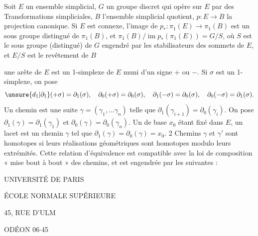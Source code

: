 Soit $E$ un ensemble simplicial,  $G$ un groupe discret qui opère sur $E$ par des Transformations simpliciales, $B$ l'ensemble simplicial quotient,  $p:E\to B$ la projection canonique. Si $E$ est connexe, l'image de $p_*:\pi_1(E)\to\pi_1(B)$ est un sous groupe distingué de $\pi_1(B)$, et $\pi_1(B)/\operatorname{im}p_*(\pi_1(E))=G/S$, où $S$ est le sous groupe (distingué) de $G$ engendré par les stabilisateurs des sommets de $E$, et $E/S$ est le revêtement  de $B$ 


 une arête de $E$ est un 1-simplexe de $E$ muni d'un signe $+$ ou $-$. Si $\sigma$ est un 1-simplexe, on pose
\[
\unsure{d_1|\partial_1}(+\sigma)=\partial_1(\sigma),\quad
\partial_0(+\sigma)=\partial_0(\sigma),\quad
\partial_1(-\sigma)=\partial_0(\sigma),\quad
\partial_0(-\sigma)=\partial_1(\sigma).
\]
Un chemin est une suite $\gamma=(\gamma_1,\ldots\gamma_n)$ telle que $\partial_1(\gamma_{i+1})=\partial_0(\gamma_i)$. On pose $\partial_1(\gamma)=\partial_1(\gamma_1)$ et $\partial_0(\gamma)=\partial_0(\gamma_n)$. Un  de base $x_0$ étant fixé dans $E$, un lacet est un chemin $\gamma$ tel que $\partial_1(\gamma)=\partial_0(\gamma)=x_0$. 2 Chemins $\gamma$ et $\gamma'$ sont homotopes si leurs réalisations géométriques sont homotopes modulo leurs extrémités. Cette relation d'équivalence est compatible avec la loi de composition « mise bout à bout » des chemins, et est engendrée par les suivantes :

\begin{center}
UNIVERSITÉ DE PARIS


ÉCOLE NORMALE SUPÉRIEURE


45, RUE D'ULM

ODÉON 06$\cdot$45

\end{center}

